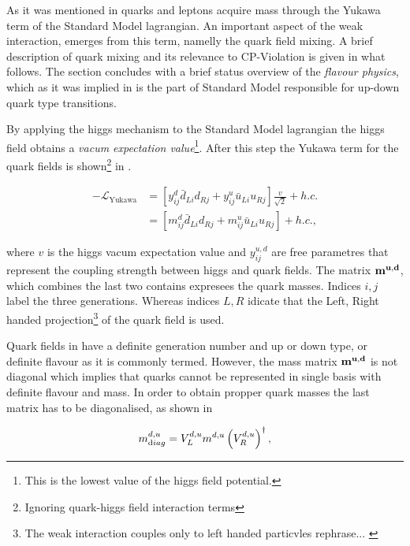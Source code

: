 As it was mentioned in  quarks and leptons acquire mass through the Yukawa term
of the Standard Model lagrangian. An important aspect of the weak interaction, emerges from this term,
namelly the quark field mixing. A brief description of quark mixing and its relevance to CP-Violation is given in what follows.
The section concludes with a brief status overview of the {\it flavour physics}, which as it was implied in 
is the part of Standard Model responsible for up-down quark type transitions.

By applying the higgs mechanism to the Standard Model lagrangian the higgs field obtains a
{\it vacum expectation value}\footnote{This is the lowest value of the higgs field potential.}.
After this step the Yukawa term for the quark fields is
shown\footnote{Ignoring quark-higgs field interaction terms} in .

\begin{align}
  -\mathscr{L}_{\text{Yukawa}} &= \left[ y_{ij}^d \bar{d}_{Li} d_{Rj} + y_{ij}^u \bar{u}_{Li} u_{Rj} \right] \frac{v}{\sqrt{2}} + h.c. \nonumber \\
                               &= \left[ m_{ij}^d \bar{d}_{Li} d_{Rj} + m_{ij}^u \bar{u}_{Li} u_{Rj} \right] + h.c.,
  \label{yukawa_flavour}
\end{align}

\noindent where $v$ is the higgs vacum expectation value and $y_{ij}^{u,d}$ are free parametres that represent the
coupling strength between higgs and quark fields. The matrix $\bf m^{u,d}$, which combines the last two contains
expresees the quark masses. Indices $i,j$ label the three generations. Whereas indices $L,R$ idicate that the Left, Right handed
projection\footnote{The weak interaction couples only to left handed particvles {\color{red} rephrase... }} of the quark field is used.

Quark fields in  have a definite generation number and up or down type, or definite flavour as it
is commonly termed. However, the mass matrix $\bf m^{u,d}$ is not diagonal which implies that quarks cannot be represented
in single basis with definite flavour and mass. In order to obtain propper quark masses the last matrix has to be diagonalised,
as shown in

\begin{equation}
  m^{d,u}_{\text diag} = V_L^{d,u} m^{d,u} \left(V_R^{d,u}\right)^{\dagger},
  \label{diagM}
\end{equation}

